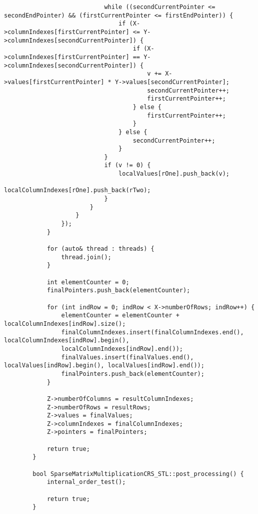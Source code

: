 \documentclass[a4paper, 14pt]{article}
\begin{document}
\begin{verbatim}
							while ((secondCurrentPointer <= secondEndPointer) && (firstCurrentPointer <= firstEndPointer)) {
								if (X->columnIndexes[firstCurrentPointer] <= Y->columnIndexes[secondCurrentPointer]) {
									if (X->columnIndexes[firstCurrentPointer] == Y->columnIndexes[secondCurrentPointer]) {
										v += X->values[firstCurrentPointer] * Y->values[secondCurrentPointer];
										secondCurrentPointer++;
										firstCurrentPointer++;
									} else {
										firstCurrentPointer++;
									}
								} else {
									secondCurrentPointer++;
								}
							}
							if (v != 0) {
								localValues[rOne].push_back(v);
								localColumnIndexes[rOne].push_back(rTwo);
							}
						}
					}
				});
			}
			
			for (auto& thread : threads) {
				thread.join();
			}
			
			int elementCounter = 0;
			finalPointers.push_back(elementCounter);
			
			for (int indRow = 0; indRow < X->numberOfRows; indRow++) {
				elementCounter = elementCounter + localColumnIndexes[indRow].size();
				finalColumnIndexes.insert(finalColumnIndexes.end(), localColumnIndexes[indRow].begin(),
				localColumnIndexes[indRow].end());
				finalValues.insert(finalValues.end(), localValues[indRow].begin(), localValues[indRow].end());
				finalPointers.push_back(elementCounter);
			}
			
			Z->numberOfColumns = resultColumnIndexes;
			Z->numberOfRows = resultRows;
			Z->values = finalValues;
			Z->columnIndexes = finalColumnIndexes;
			Z->pointers = finalPointers;
			
			return true;
		}
		
		bool SparseMatrixMultiplicationCRS_STL::post_processing() {
			internal_order_test();
			
			return true;
		}
	\end{verbatim}
	
\end{document}
